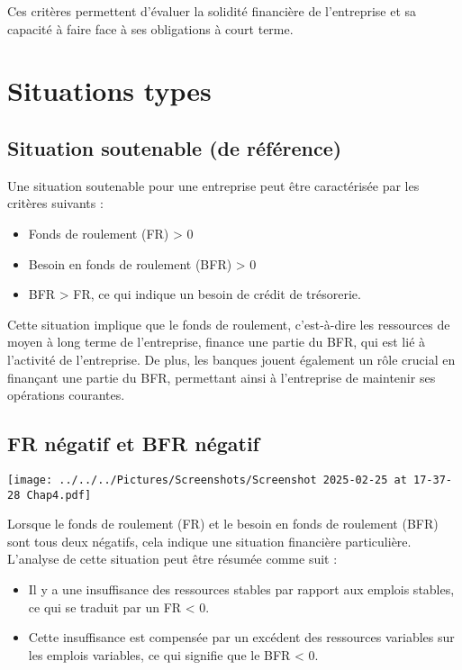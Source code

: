 \documentclass[a4paper, 12pt]{report}
\begin{document}
Ces critères permettent d'évaluer la solidité financière de l'entreprise et sa capacité à faire face à ses obligations à court terme.

\section{Situations types}

\subsection{Situation soutenable (de référence)}

Une situation soutenable pour une entreprise peut être caractérisée par les critères suivants :

\begin{itemize}
	\item Fonds de roulement (FR) > 0
	\item Besoin en fonds de roulement (BFR) > 0
	\item BFR > FR, ce qui indique un besoin de crédit de trésorerie.
\end{itemize}

Cette situation implique que le fonds de roulement, c'est-à-dire les ressources de moyen à long terme de l'entreprise, finance une partie du BFR, qui est lié à l'activité de l'entreprise. De plus, les banques jouent également un rôle crucial en finançant une partie du BFR, permettant ainsi à l'entreprise de maintenir ses opérations courantes.

\subsection{FR négatif et BFR négatif}

\begin{center}
	\texttt{[image: ../../../Pictures/Screenshots/Screenshot 2025-02-25 at 17-37-28 Chap4.pdf]}
\end{center}

Lorsque le fonds de roulement (FR) et le besoin en fonds de roulement (BFR) sont tous deux négatifs, cela indique une situation financière particulière. L'analyse de cette situation peut être résumée comme suit :

\begin{itemize}
	\item Il y a une insuffisance des ressources stables par rapport aux emplois stables, ce qui se traduit par un FR < 0.
	\item Cette insuffisance est compensée par un excédent des ressources variables sur les emplois variables, ce qui signifie que le BFR < 0.
\end{itemize}
\end{document}
